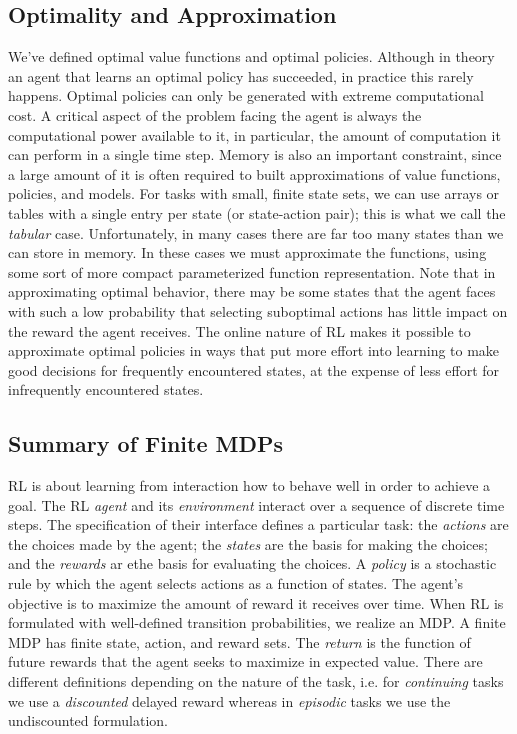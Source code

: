 \documentclass[12pt]{article}
\begin{document}
\subsection{Optimality and Approximation}
We've defined optimal value functions and optimal policies. Although in theory an agent that learns an optimal policy has succeeded, in practice this rarely happens. Optimal policies can only be generated with extreme computational cost. A critical aspect of the problem facing the agent is always the computational power available to it, in particular, the amount of computation it can perform in a single time step. Memory is also an important constraint, since a large amount of it is often required to built approximations of value functions, policies, and models. For tasks with small, finite state sets, we can use arrays or tables with a single entry per state (or state-action pair); this is what we call the \emph{tabular} case. Unfortunately, in many cases there are far too many states than we can store in memory. In these cases we must approximate the functions, using some sort of more compact parameterized function representation. Note that in approximating optimal behavior, there may be some states that the agent faces with such a low probability that selecting suboptimal actions has little impact on the reward the agent receives. The online nature of RL makes it possible to approximate optimal policies in ways that put more effort into learning to make good decisions for frequently encountered states, at the expense of less effort for infrequently encountered states.

\subsection{Summary of Finite MDPs}
 RL is about learning from interaction how to behave well in order to achieve a goal. The RL \emph{agent} and its \emph{environment} interact over a sequence of discrete time steps. The specification of their interface defines a particular task: the \emph{actions} are the choices made by the agent; the \emph{states} are the basis for making the choices; and the \emph{rewards} ar ethe basis for evaluating the choices. A \emph{policy} is a stochastic rule by which the agent selects actions as a function of states. The agent's objective is to maximize the amount of reward it receives over time. When RL is formulated with well-defined transition probabilities, we realize an MDP. A finite MDP has finite state, action, and reward sets. The \emph{return} is the function of future rewards that the agent seeks to maximize in expected value. There are different definitions depending on the nature of the task, i.e. for \emph{continuing} tasks we use a \emph{discounted} delayed reward whereas in \emph{episodic} tasks we use the undiscounted formulation.
\end{document}
